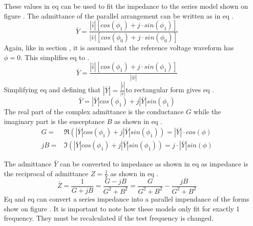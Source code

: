 These values in eq  can be used to fit the impedance to the series model shown on figure . The admittance of the parallel arrangement can be written as in eq .
\begin{equation}\label{eq:4_1_5_ParallelModel1}
    \bar Y = \frac{|\bar i| [cos(\phi_1) + j\cdot sin(\phi_1)]}{|\bar v| [cos(\phi_0) +j\cdot sin(\phi_0)]}
\end{equation}
Again, like in section , it is assumed that the reference voltage waveform has $\phi = 0$. This simplifies eq  to .
\begin{equation}\label{eq:4_1_5_ParallelModel2}
    \bar Y = \frac{|\bar i| [cos(\phi_1) + j\cdot sin(\phi_1)]}{|\bar v|}
\end{equation}
Simplifying eq  and defining that $|\bar Y| = \frac{|\bar i|}{|\bar v|}$to rectangular form gives eq .
\begin{equation}\label{eq:4_1_5_ParallelModel3}
    \bar Y = |\bar Y| cos(\phi_1) + j |\bar Y| sin(\phi_1)
\end{equation}
The real part of the complex admittance is the conductance $G$ while the imaginary part is the susceptance $B$ as shown in eq .
\begin{equation}\label{eq:4_1_5_ParallelModel4}
    \begin{split}
        G =& \Re(|\bar Y| cos(\phi_1) + j |\bar Y| sin(\phi_1)) = |\bar Y| \cdot cos(\phi)\\
        jB =& \Im(|\bar Y| cos(\phi_1) + j |\bar Y| sin(\phi_1)) =  j\cdot |\bar Y| sin(\phi)  
    \end{split}
\end{equation}

The admittance $\bar Y$ can be converted to impedance as shown in eq  as impedance is the reciprocal of admittance $Z = \frac{1}{Y}$ as shown in eq .
\begin{equation}\label{eq:4_1_5_ParallelModel5}
    \bar Z = \frac{1}{G + jB} =\frac{G-jB}{G^2 + B^2} = \frac{G}{G^2 + B^2} -\frac{jB}{G^2 + B^2}
\end{equation}
Eq  and eq  can convert a series impedance into a parallel impendance of the forms show on figure . It is important to note how these models only fit for exactly 1 frequency. They must be recalculated if the test frequency is changed.
